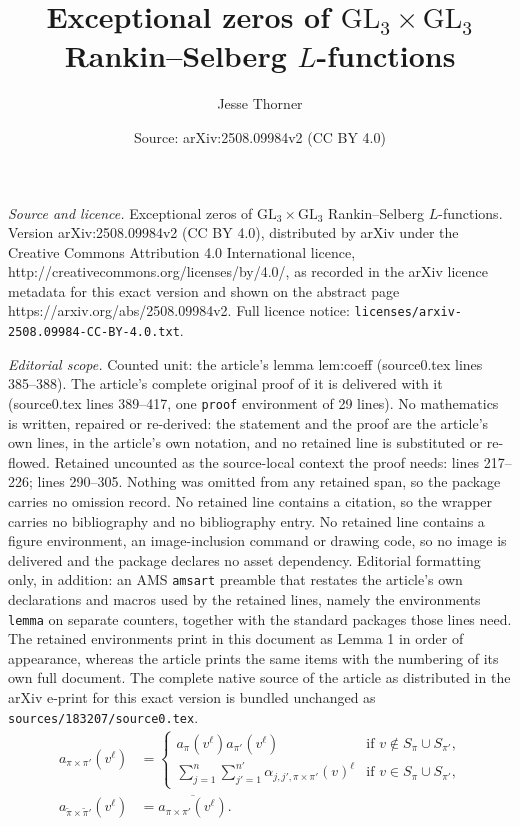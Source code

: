 \documentclass[10pt,a4paper]{amsart}
\title{Exceptional zeros of $\mathrm{GL}_3\times\mathrm{GL}_3$ Rankin--Selberg $L$-functions}
\author{Jesse Thorner}
\date{Source: arXiv:2508.09984v2 (CC BY 4.0)}
\begin{document}
\maketitle

\noindent\emph{Source and licence.} Exceptional zeros of $\mathrm{GL}_3\times\mathrm{GL}_3$ Rankin--Selberg $L$-functions. Version arXiv:2508.09984v2 (CC BY 4.0), distributed by arXiv under the Creative Commons Attribution 4.0 International licence, http://creativecommons.org/licenses/by/4.0/, as recorded in the arXiv licence metadata for this exact version and shown on the abstract page https://arxiv.org/abs/2508.09984v2. Full licence notice: \texttt{licenses/arxiv-2508.09984-CC-BY-4.0.txt}.\par\smallskip

\noindent\textit{Editorial scope.} Counted unit: the article's lemma lem:coeff (source0.tex lines 385--388). The article's complete original proof of it is delivered with it (source0.tex lines 389--417, one \texttt{proof} environment of 29 lines). No mathematics is written, repaired or re-derived: the statement and the proof are the article's own lines, in the article's own notation, and no retained line is substituted or re-flowed.  Retained uncounted as the source-local context the proof needs: lines 217--226; lines 290--305.  Nothing was omitted from any retained span, so the package carries no omission record.  No retained line contains a citation, so the wrapper carries no bibliography and no bibliography entry.  No retained line contains a figure environment, an image-inclusion command or drawing code, so no image is delivered and the package declares no asset dependency.  Editorial formatting only, in addition: an AMS \texttt{amsart} preamble that restates the article's own declarations and macros used by the retained lines, namely the environments \texttt{lemma} on separate counters, together with the standard packages those lines need.  The retained environments print in this document as Lemma 1 in order of appearance, whereas the article prints the same items with the numbering of its own full document.  The complete native source of the article as distributed in the arXiv e-print for this exact version is bundled unchanged as \texttt{sources/183207/source0.tex}.
	\begin{equation}
	\label{eqn:a_def}
	\begin{aligned}
	a_{\pi\times\pi'}(v^{\ell})&= \begin{cases}
 	a_{\pi}(v^{\ell})a_{\pi'}(v^{\ell})&\mbox{if $v\notin S_{\pi}\cup S_{\pi'}$,}\\
 	\sum_{j=1}^n \sum_{j'=1}^{n'}\alpha_{j,j',\pi\times\pi'}(v)^{\ell}&\mbox{if $v\in S_{\pi}\cup S_{\pi'}$,}
 \end{cases}\\
 a_{\widetilde{\pi}\times\widetilde{\pi}'}(v^{\ell})&=\overline{a_{\pi\times\pi'}(v^{\ell})}.
 \end{aligned}
	\end{equation}
\end{document}
